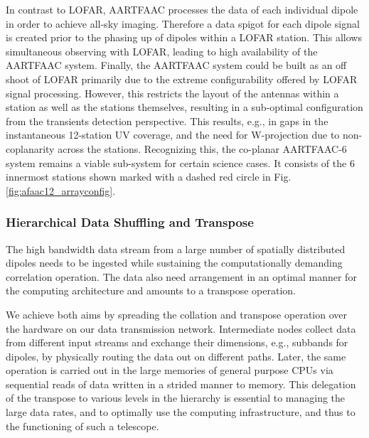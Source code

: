 \documentclass{ws-jai}
\begin{document}
In contrast to  LOFAR, AARTFAAC processes the data of  each individual dipole in
order to achieve all-sky imaging. Therefore a data spigot for each dipole signal
is created  prior to  the phasing up  of dipoles within  a LOFAR  station.  This
allows simultaneous  observing with LOFAR,  leading to high availability  of the
AARTFAAC system.  Finally, the AARTFAAC system could be built as an off shoot of
LOFAR  primarily due  to the  extreme  configurability offered  by LOFAR  signal
processing.  However, this restricts the layout of the antennas within a station
as well  as the  stations themselves, resulting  in a  sub-optimal configuration
from the transients  detection perspective.  This results, e.g., in  gaps in the
instantaneous  12-station UV  coverage, and  the  need for  W-projection due  to
non-coplanarity across the stations.  Recognizing this, the co-planar AARTFAAC-6
system remains a viable sub-system for certain science cases. It consists of the
6   innermost   stations   shown   marked   with  a   dashed   red   circle   in
Fig. \ref{fig:afaac12_arrayconfig}.

\subsubsection   {Hierarchical  Data   Shuffling  and  Transpose}
  The  high
bandwidth data stream from a large number of spatially distributed dipoles needs
to  be  ingested  while  sustaining the  computationally  demanding  correlation
operation. The data also need arrangement in an optimal manner for the computing
architecture and amounts to a transpose operation.

We achieve both aims by spreading the collation and transpose operation over the
hardware on our data transmission  network. Intermediate nodes collect data from
different  input  streams and  exchange  their  dimensions, e.g.,  subbands  for
dipoles, by physically routing the data  out on different paths. Later, the same
operation  is carried  out in  the large  memories of  general purpose  CPUs via
sequential reads of data written in a strided manner to memory.  This delegation
of the transpose to various levels in the hierarchy is essential to managing the
large data rates, and to optimally use the computing infrastructure, and thus to
the functioning of such a telescope.
\end{document}
